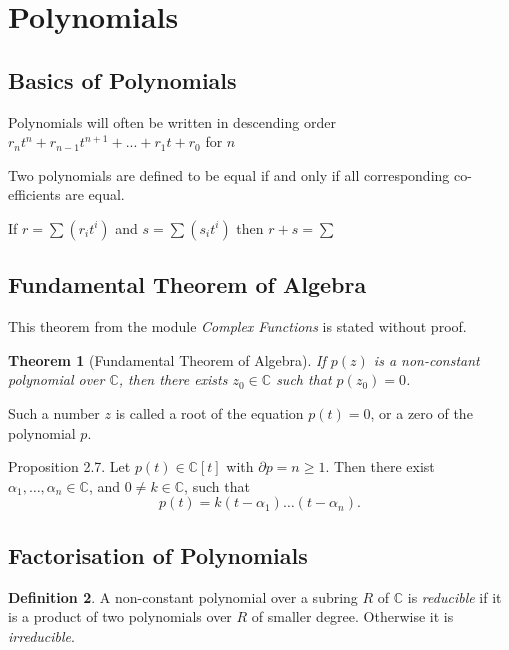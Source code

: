 \documentclass[12pt]{article}
\newtheorem{theorem}{Theorem}
\theoremstyle{definition}
\newtheorem{definition}[theorem]{Definition}
\begin{document}
\section{Polynomials}
\subsection{Basics of Polynomials}
Polynomials will often be written in descending order $r_n t^n + r_{n-1} t^{n+1} + ... + r_1 t + r_0$ for $n$

Two polynomials are defined to be equal if and only if all corresponding co-efficients are equal.

If $r = \sum (r_i t^i)$ and $s = \sum (s_i t^i)$ then $r+s = \sum$



\subsection{Fundamental Theorem of Algebra} 
This theorem from the module \textit{Complex Functions} is stated without proof. 

\begin{theorem}[Fundamental Theorem of Algebra] \label{thm:fundamental-algebra}
    If $p(z)$ is a non-constant polynomial over $\mathbb{C}$, then there exists $z_0 \in \mathbb{C}$ such that $p\left(z_0\right)=0$.
\end{theorem}

Such a number $z$ is called a root of the equation $p(t)=0$, or a zero of the polynomial $p$. 

Proposition 2.7. Let $p(t) \in \mathbb{C}[t]$ with $\partial p=n \geq 1$. Then there exist $\alpha_1, \ldots, \alpha_n \in \mathbb{C}$, and $0 \neq k \in \mathbb{C}$, such that
$$
p(t)=k\left(t-\alpha_1\right) \ldots\left(t-\alpha_n\right).
$$

\subsection{Factorisation of Polynomials}
\begin{definition}
     A non-constant polynomial over a subring $R$ of $\mathbb{C}$ is \textit{reducible} if it is a product of two polynomials over $R$ of smaller degree. Otherwise it is \textit{irreducible}.
\end{definition}
\end{document}
